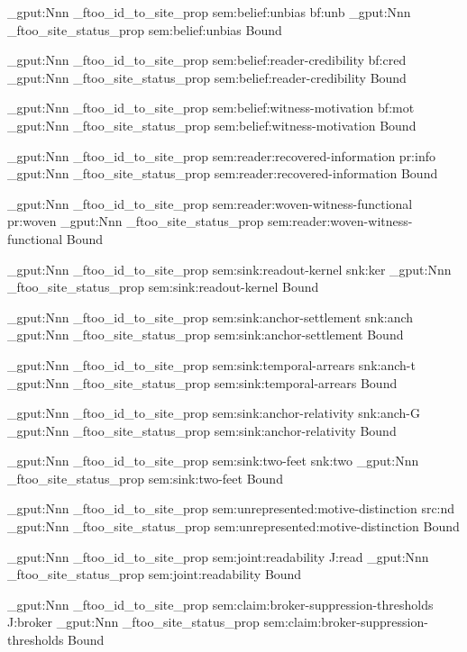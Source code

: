 \prop_gput:Nnn \g_ftoo_id_to_site_prop { sem:belief:unbias } { bf:unb }
\prop_gput:Nnn \g_ftoo_site_status_prop { sem:belief:unbias } { Bound }

\prop_gput:Nnn \g_ftoo_id_to_site_prop { sem:belief:reader-credibility } { bf:cred }
\prop_gput:Nnn \g_ftoo_site_status_prop { sem:belief:reader-credibility } { Bound }

\prop_gput:Nnn \g_ftoo_id_to_site_prop { sem:belief:witness-motivation } { bf:mot }
\prop_gput:Nnn \g_ftoo_site_status_prop { sem:belief:witness-motivation } { Bound }

\prop_gput:Nnn \g_ftoo_id_to_site_prop { sem:reader:recovered-information } { pr:info }
\prop_gput:Nnn \g_ftoo_site_status_prop { sem:reader:recovered-information } { Bound }

\prop_gput:Nnn \g_ftoo_id_to_site_prop { sem:reader:woven-witness-functional } { pr:woven }
\prop_gput:Nnn \g_ftoo_site_status_prop { sem:reader:woven-witness-functional } { Bound }

\prop_gput:Nnn \g_ftoo_id_to_site_prop { sem:sink:readout-kernel } { snk:ker }
\prop_gput:Nnn \g_ftoo_site_status_prop { sem:sink:readout-kernel } { Bound }

\prop_gput:Nnn \g_ftoo_id_to_site_prop { sem:sink:anchor-settlement } { snk:anch }
\prop_gput:Nnn \g_ftoo_site_status_prop { sem:sink:anchor-settlement } { Bound }

\prop_gput:Nnn \g_ftoo_id_to_site_prop { sem:sink:temporal-arrears } { snk:anch-t }
\prop_gput:Nnn \g_ftoo_site_status_prop { sem:sink:temporal-arrears } { Bound }

\prop_gput:Nnn \g_ftoo_id_to_site_prop { sem:sink:anchor-relativity } { snk:anch-G }
\prop_gput:Nnn \g_ftoo_site_status_prop { sem:sink:anchor-relativity } { Bound }

\prop_gput:Nnn \g_ftoo_id_to_site_prop { sem:sink:two-feet } { snk:two }
\prop_gput:Nnn \g_ftoo_site_status_prop { sem:sink:two-feet } { Bound }

\prop_gput:Nnn \g_ftoo_id_to_site_prop { sem:unrepresented:motive-distinction } { src:nd }
\prop_gput:Nnn \g_ftoo_site_status_prop { sem:unrepresented:motive-distinction } { Bound }

\prop_gput:Nnn \g_ftoo_id_to_site_prop { sem:joint:readability } { J:read }
\prop_gput:Nnn \g_ftoo_site_status_prop { sem:joint:readability } { Bound }

\prop_gput:Nnn \g_ftoo_id_to_site_prop { sem:claim:broker-suppression-thresholds } { J:broker }
\prop_gput:Nnn \g_ftoo_site_status_prop { sem:claim:broker-suppression-thresholds } { Bound }

